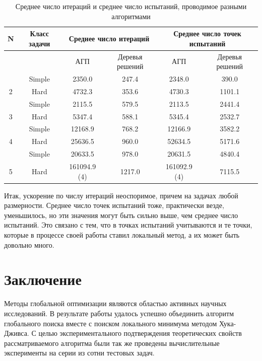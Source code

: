 \documentclass[12pt, a4paper, russian]{article}
\begin{document}
\begin{table}[h!]
    \caption{Среднее число итераций и среднее число испытаний, проводимое разными алгоритмами}
    \label{tab:2}
    \centering
    \begin{tabular}{|c|c|c|c|c|c|}
    \hline
	
        N & Класс задачи & \multicolumn{2}{c|}{Среднее число итераций} & \multicolumn{2}{c|}{Среднее число точек испытаний} \\ \hline
          & ~ & АГП & Деревья решений & АГП & Деревья решений \\ \hline
          & Simple & 2350.0 & 247.4 & 2348.0 & 390.0  \\ \hline
        2  & Hard & 4732.3 & 353.6 & 4730.3 & 1101.1  \\ \hline
          & Simple & 2115.5 & 579.5 & 2113.5 & 2441.4  \\ \hline
        3  & Hard & 5347.4 & 588.1 & 5345.4 & 2532.7  \\ \hline
          & Simple & 12168.9 & 768.2 & 12166.9 & 3582.2  \\ \hline
        4  & Hard & 25636.5 & 960.0 & 52634.5 & 5171.6  \\ \hline
          & Simple & 20633.5 & 978.0 & 20631.5 & 4840.4  \\ \hline
        5  & Hard & 161094.9 (4) & 1217.0 & 161092.9 (4) & 7115.5  \\ \hline
    \end{tabular}
\end{table}

Итак, ускорение по числу итераций неоспоримое, причем на задачах любой размерности. Среднее число точек испытаний тоже, практически везде, уменьшилось, но эти значения могут быть сильно выше, чем среднее число испытаний. Это связано с тем, что в точках испытаний учитываются и те точки, которые в процессе своей работы ставил локальный метод, а их может быть довольно много.


\section{Заключение}

Методы глобальной оптимизации являются областью активных научных исследований.  В результате работы удалось успешно объединить алгоритм глобального поиска вместе с поиском локального минимума методом Хука-Дживса. С целью экспериментального подтверждения теоретических свойств рассматриваемого алгоритма были так же проведены вычислительные эксперименты на серии из сотни тестовых задач. 
\end{document}
